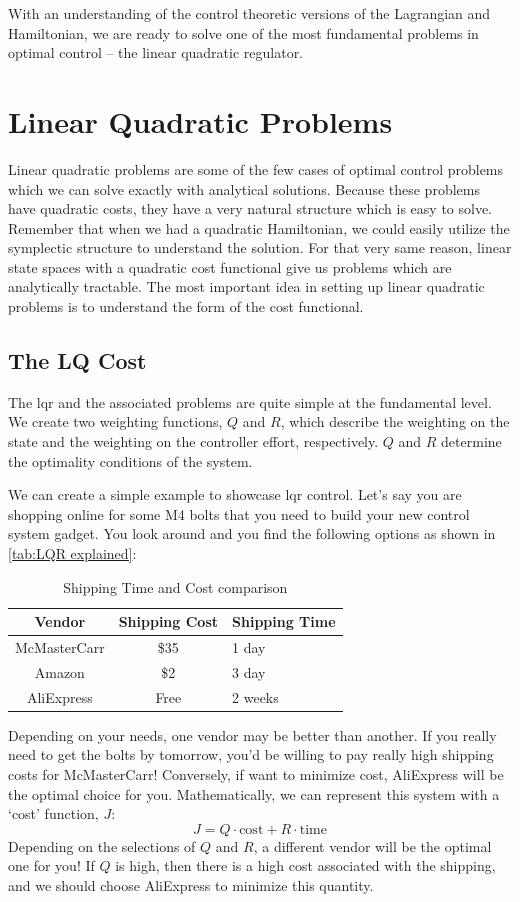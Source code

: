 With an understanding of the control theoretic versions of the \gls{Lagrangian} and \gls{Hamiltonian}, we are ready to solve one of the most fundamental problems in optimal control -- the linear quadratic regulator.

\section{Linear Quadratic Problems}

Linear quadratic problems are some of the few cases of optimal control problems which we can solve exactly with analytical solutions. Because these problems have quadratic costs, they have a very natural structure which is easy to solve. Remember that when we had a quadratic \gls{Hamiltonian}, we could easily utilize the symplectic structure to understand the solution. For that very same reason, linear state spaces with a quadratic cost functional give us problems which are analytically tractable. The most important idea in setting up linear quadratic problems is to understand the form of the cost functional. 

\subsection{The LQ Cost}
The \gls{lqr} and the associated problems are quite simple at the fundamental level. We create two weighting functions, $Q$ and $R$, which describe the weighting on the state and the weighting on the controller effort, respectively. $Q$ and $R$ determine the optimality conditions of the system.

\begin{example}
    We can create a simple example to showcase \gls{lqr} control. Let's say you are shopping online for some M4 bolts that you need to build your new control system gadget. You look around and you find the following options as shown in \autoref{tab:LQR explained}:
\begin{table}[H]
    \centering
    \begin{tabular}{c|cl}
         Vendor&   Shipping Cost&Shipping Time\\\midrule
         McMasterCarr& 
     \$35&1 day\\
 Amazon& \$2&3 day\\
 AliExpress& Free&2 weeks
 \end{tabular}
    \caption{Shipping Time and Cost comparison}
    \label{tab:LQR explained}
\end{table}

Depending on your needs, one vendor may be better than another. If you really need to get the bolts by tomorrow, you'd be willing to pay really high shipping costs for McMasterCarr! Conversely, if want to minimize cost, AliExpress will be the optimal choice for you. Mathematically, we can represent this system with a `cost' function, $J$:
$$J=Q\cdot\mathrm{cost}+R\cdot\mathrm{time}$$
Depending on the selections of $Q$ and $R$, a different vendor will be the optimal one for you! If $Q$ is high, then there is a high cost associated with the shipping, and we should choose AliExpress to minimize this quantity.
\end{example}

